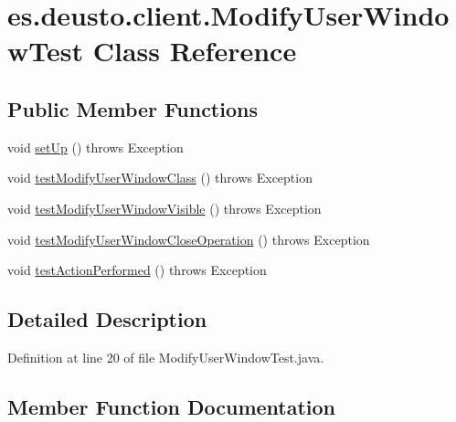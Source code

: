 \hypertarget{classes_1_1deusto_1_1client_1_1_modify_user_window_test}{}\section{es.\+deusto.\+client.\+Modify\+User\+Window\+Test Class Reference}
\label{classes_1_1deusto_1_1client_1_1_modify_user_window_test}
\subsection*{Public Member Functions}
\begin{DoxyCompactItemize}
\item 
void \hyperlink{classes_1_1deusto_1_1client_1_1_modify_user_window_test_ae1cc9b57d41fd70647e3d516173943ec}{set\+Up} ()  throws Exception 
\item 
void \hyperlink{classes_1_1deusto_1_1client_1_1_modify_user_window_test_aabc82eb3db1d8840e8d04bf05541f407}{test\+Modify\+User\+Window\+Class} ()  throws Exception 
\item 
void \hyperlink{classes_1_1deusto_1_1client_1_1_modify_user_window_test_aaa2f9f6ce4607df013e00284b44f1973}{test\+Modify\+User\+Window\+Visible} ()  throws Exception 
\item 
void \hyperlink{classes_1_1deusto_1_1client_1_1_modify_user_window_test_ae1c496d5a25114e058f9a4b3d6ee3448}{test\+Modify\+User\+Window\+Close\+Operation} ()  throws Exception 
\item 
void \hyperlink{classes_1_1deusto_1_1client_1_1_modify_user_window_test_aca6f21a450cec46bef1d520afa65562f}{test\+Action\+Performed} ()  throws Exception 
\end{DoxyCompactItemize}


\subsection{Detailed Description}


Definition at line 20 of file Modify\+User\+Window\+Test.\+java.



\subsection{Member Function Documentation}
\mbox{\label{classes_1_1deusto_1_1client_1_1_modify_user_window_test_ae1cc9b57d41fd70647e3d516173943ec}} 
